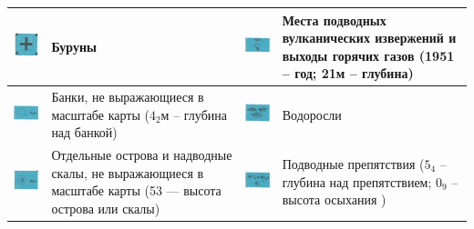 \documentclass[a4paper, 12pt, twoside, final, book, russian, fittopage, cyremdash]{ncc}
\begin{document}
\begin{longtable}{M|m{0.2\textwidth}|M|m{0.2\textwidth}}
  \midrule
  \includegraphics[scale=1.3]{APP-2-A-4} & Буруны &
  \includegraphics[scale=1.3]{APP-2-A-12} & Места подводных вулканических извержений и выходы горячих газов (1951 \--- год; 21м \--- глубина) \\
  \midrule
  \includegraphics[scale=1.3]{APP-2-A-5} & Банки, не выражающиеся в масштабе карты ($4_2$м \--- глубина над банкой) &
  \includegraphics[scale=1.3]{APP-2-A-13} & Водоросли \\
  \midrule
  \includegraphics[scale=1.3]{APP-2-A-6} &  Отдельные острова и надводные скалы, не выражающиеся в масштабе карты (53 --- высота острова или скалы) &
  \includegraphics[scale=1.3]{APP-2-A-14} & Подводные препятствия ($5_4$ \--- глубина над препятствием; $0_9$ \--- высота осыхания ) \\
  \midrule

\end{longtable}
\end{document}

